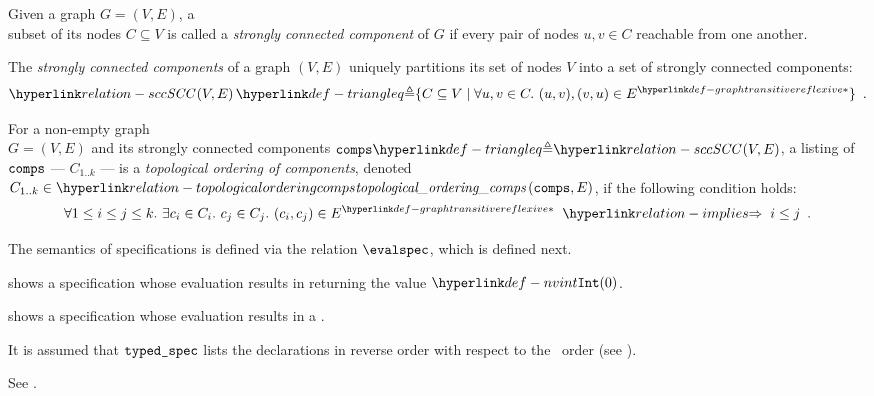 
\begin{definition}
\hypertarget{relation-scc}{}
Given a graph $G=(V, E)$, a \\ subset of its nodes $C \subseteq V$ is called
a \emph{strongly connected component} of $G$ if
every pair of nodes $u,v \in C$ reachable from one another.

The \emph{strongly connected components} of a graph $(V, E)$ uniquely partitions its set of
nodes $V$ into a set of strongly connected components:
\[
\sccop[H]{V}{E} \triangleq \{ C \subseteq V \;|\; \forall u,v\in C.\ (u,v), (v,u) \in \graphtransitivereflexive{E} \} \enspace.
\]
\end{definition}

\hypertarget{relation-topologicalorderingcomps}{}
\begin{definition}
For a non-empty graph \\
$G=(V, E)$ and its strongly connected components $\comps \triangleq \sccop[H]{V}{E}$,
a listing of $\texttt{comps}$ ---
$C_{1..k}$ --- is a \emph{topological ordering of components},
denoted \\
$C_{1..k} \in \topologicalorderingcomps[H]{\comps}{E}$, if the following condition holds:
\[
  \forall 1 \leq i \leq j \leq k.\ \exists c_i\in C_i.\ c_j\in C_j.\ (c_i,c_j) \in \graphtransitivereflexive{E} \;\;\implies\;\;
  i \leq j \enspace .
\]
\end{definition}

The semantics of specifications is defined via the relation $\evalspec$, which is defined next.


 shows a specification
whose evaluation results in returning the value $\nvint(0)$.

 shows a specification whose evaluation
results in a \dynamicerrorterm.



It is assumed that $\texttt{typed\_spec}$ lists the declarations in reverse order with respect
to the \ order
(see ).

See .

